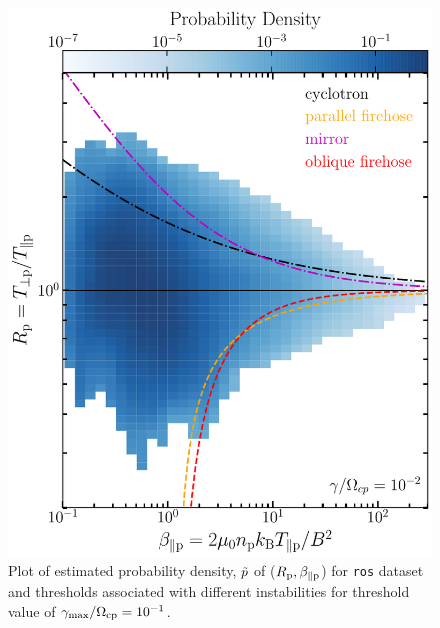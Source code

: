     \begin{figure}
        \begin{center}
            \includegraphics[width=1\textwidth]{figures/apdxA/brazil_prob_3d.pdf}
            \caption[Brazil-plot of \texttt{ros} dataset]{Plot of estimated probability density,
            $\Tilde{p}$ of ($R_{\rm p}, \beta_{\parallel \rm p}$) for \texttt{ros} dataset and
            thresholds associated with different instabilities for threshold value of
            $\gamma_{\max}/\Omega_{\rm cp} = 10^{-1}$.}
            \label{fig:brazil_prob_ros}
        \end{center}
    \end{figure}

